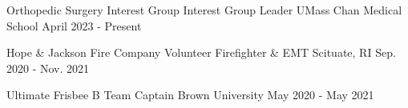 
\begin{cventries}

\vspace{-1mm}
\cventry
  {Orthopedic Surgery Interest Group} %
  {Interest Group Leader} %
  {UMass Chan Medical School} %
  {April 2023 - Present} %
  {}

  \cventry
    {Hope \& Jackson Fire Company} %
    {Volunteer Firefighter \& EMT} %
    {Scituate, RI} %
    {Sep. 2020 - Nov. 2021} %
    {}

\cventry
{Ultimate Frisbee B Team} %
{Captain} %
{Brown University} %
{May 2020 - May 2021} %
{}

\end{cventries}
